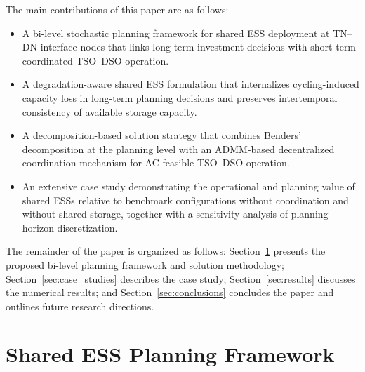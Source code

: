\documentclass[preprint,12pt]{elsarticle}
\begin{document}
The main contributions of this paper are as follows:
\begin{itemize}
    \item A bi-level stochastic planning framework for shared ESS deployment at TN--DN interface nodes that links long-term investment decisions with short-term coordinated TSO--DSO operation.
    \item A degradation-aware shared ESS formulation that internalizes cycling-induced capacity loss in long-term planning decisions and preserves intertemporal consistency of available storage capacity.
    \item A decomposition-based solution strategy that combines Benders' decomposition at the planning level with an ADMM-based decentralized coordination mechanism for AC-feasible TSO--DSO operation.
    \item An extensive case study demonstrating the operational and planning value of shared ESSs relative to benchmark configurations without coordination and without shared storage, together with a sensitivity analysis of planning-horizon discretization.
\end{itemize}


The remainder of the paper is organized as follows: 
Section~\ref{sec:methodology} presents the proposed bi-level planning framework and solution methodology;
Section~\ref{sec:case_studies} describes the case study;
Section~\ref{sec:results} discusses the numerical results; and 
Section~\ref{sec:conclusions} concludes the paper and outlines future research directions.


\section{Shared ESS Planning Framework}
\label{sec:methodology}
\end{document}
